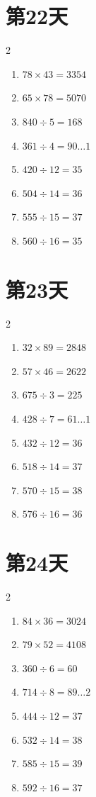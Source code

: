 \documentclass[12pt]{ctexart}
\begin{document}
	\section*{第22天}
	\begin{multicols}{2}
		\begin{enumerate}[itemsep=0pt]
			\item $78 \times 43 = 3354$
			\item $65 \times 78 = 5070$
			\item $840 \div 5 = 168$
			\item $361 \div 4 = 90\ldots 1$
			\item $420 \div 12 = 35$
			\item $504 \div 14 = 36$
			\item $555 \div 15 = 37$
			\item $560 \div 16 = 35$
		\end{enumerate}
	\end{multicols}
	
	\section*{第23天}
	\begin{multicols}{2}
		\begin{enumerate}[itemsep=0pt]
			\item $32 \times 89 = 2848$
			\item $57 \times 46 = 2622$
			\item $675 \div 3 = 225$
			\item $428 \div 7 = 61\ldots 1$
			\item $432 \div 12 = 36$
			\item $518 \div 14 = 37$
			\item $570 \div 15 = 38$
			\item $576 \div 16 = 36$
		\end{enumerate}
	\end{multicols}
	
	\section*{第24天}
	\begin{multicols}{2}
		\begin{enumerate}[itemsep=0pt]
			\item $84 \times 36 = 3024$
			\item $79 \times 52 = 4108$
			\item $360 \div 6 = 60$
			\item $714 \div 8 = 89\ldots 2$
			\item $444 \div 12 = 37$
			\item $532 \div 14 = 38$
			\item $585 \div 15 = 39$
			\item $592 \div 16 = 37$
		\end{enumerate}
	\end{multicols}
	
\end{document}

